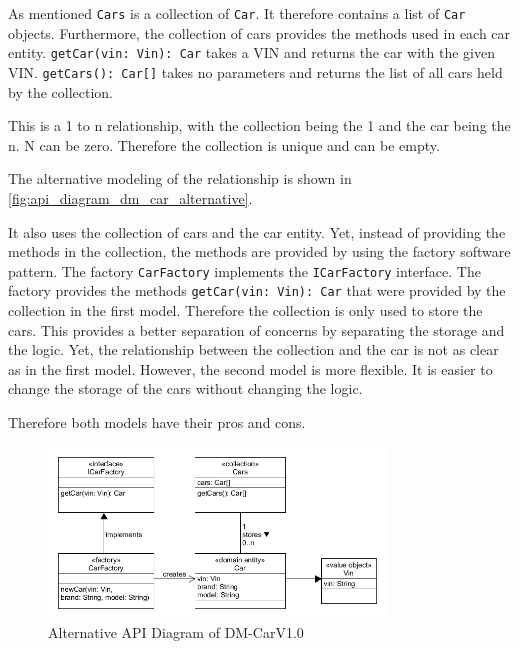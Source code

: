 As mentioned \texttt{Cars} is a collection of \texttt{Car}.
It therefore contains a list of \texttt{Car} objects.
Furthermore, the collection of cars provides the methods used in each car entity.
\texttt{getCar(vin: Vin): Car} takes a VIN and returns the car with the given VIN.
\texttt{getCars(): Car[]} takes no parameters and returns the list of all cars held by the collection.

This is a 1 to n relationship, with the collection being the 1 and the car being the n.
N can be zero.
Therefore the collection is unique and can be empty.

The alternative modeling of the relationship is shown in \autoref{fig:api_diagram_dm_car_alternative}.

It also uses the collection of cars and the car entity.
Yet, instead of providing the methods in the collection, the methods are provided by using the factory software pattern.
The factory \texttt{CarFactory} implements the \texttt{ICarFactory} interface.
The factory provides the methods \texttt{getCar(vin: Vin): Car} that were provided by the collection in the first model.
Therefore the collection is only used to store the cars.
This provides a better separation of concerns by separating the storage and the logic.
Yet, the relationship between the collection and the car is not as clear as in the first model.
However, the second model is more flexible.
It is easier to change the storage of the cars without changing the logic.

Therefore both models have their pros and cons.

\begin{figure}[H]
    \centering
    \includegraphics[width=0.8\textwidth]{figures/microservices/dmCar/apiDiagramDM-CarExtended.png}
    \caption{Alternative API Diagram of DM-CarV1.0}
    \label{fig:api_diagram_dm_car_alternative}
\end{figure}

